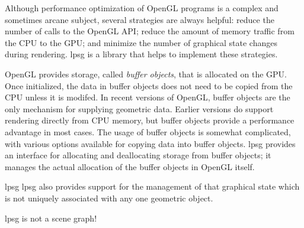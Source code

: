 Although performance optimization of OpenGL programs is a complex and
sometimes arcane subject, several strategies are always helpful:
reduce the number of calls to the OpenGL API; reduce the amount of
memory traffic from the CPU to the GPU; and minimize the number of
graphical state changes during rendering. lpsg is a library that helps
to implement these strategies.

OpenGL provides storage, called \emph{buffer objects}, that is
allocated on the GPU. Once initialized, the data in buffer objects
does not need to be copied from the CPU unless it is modifed. In
recent versions of OpenGL, buffer objects are the only mechanism for
supplying geometric data. Earlier versions do support rendering
directly from CPU memory, but buffer objects provide a performance
advantage in most cases. The usage of buffer objects is somewhat
complicated, with various options available for copying data into
buffer objects. lpsg provides an interface for allocating and
deallocating storage from buffer objects; it manages the actual
allocation of the buffer objects in OpenGL itself.

lpsg 
lpsg also provides support for the management of that graphical state which
is not uniquely associated with any one geometric object.

lpsg is not a scene graph!

